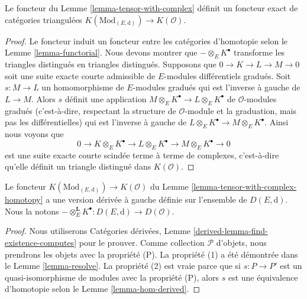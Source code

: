\begin{lemma}
\label{lemma-tensor-with-complex-homotopy}
Le foncteur du Lemme \ref{lemma-tensor-with-complex} définit un foncteur exact de
catégories triangulées $K(\text{Mod}_{(E, \text{d})}) \to K(\mathcal{O})$.
\end{lemma}

\begin{proof}
Le foncteur induit un foncteur entre les catégories d'homotopie selon le Lemme
\ref{lemma-functorial}. Nous devons montrer que $- \otimes_E K^\bullet$ transforme
les triangles distingués en triangles distingués. Supposons que $0 \to K \to L \to
M \to 0$ soit une suite exacte courte admissible de $E$-modules différentiels
gradués. Soit $s : M \to L$ un homomorphisme de $E$-modules gradués qui est
l'inverse à gauche de $L \to M$. Alors $s$ définit une application $M \otimes_E
K^\bullet \to L \otimes_E K^\bullet$ de $\mathcal{O}$-modules gradués
(c'est-à-dire, respectant la structure de $\mathcal{O}$-module et la graduation,
mais pas les différentielles) qui est l'inverse à gauche de $L \otimes_E K^\bullet
\to M \otimes_E K^\bullet$. Ainsi nous voyons que
$$
0 \to K \otimes_E K^\bullet \to L \otimes_E K^\bullet \to
M \otimes_E K^\bullet \to 0
$$
est une suite exacte courte scindée terme à terme de complexes, c'est-à-dire qu'elle
définit un triangle distingué dans $K(\mathcal{O})$.
\end{proof}

\begin{lemma}
\label{lemma-tensor-with-complex-derived}
Le foncteur $K(\text{Mod}_{(E, \text{d})}) \to K(\mathcal{O})$ du Lemme
\ref{lemma-tensor-with-complex-homotopy} a une version dérivée à gauche définie
sur l'ensemble de $D(E, \text{d})$. Nous la notons $- \otimes_E^\mathbf{L}
K^\bullet : D(E, \text{d}) \to D(\mathcal{O})$.
\end{lemma}

\begin{proof}
Nous utiliserons Catégories dérivées, Lemme
\ref{derived-lemma-find-existence-computes} pour le prouver. Comme
collection $\mathcal{P}$ d'objets, nous prendrons les objets avec la propriété
(P). La propriété (1) a été démontrée dans le Lemme \ref{lemma-resolve}. La
propriété (2) est vraie parce que si $s : P \to P'$ est un quasi-isomorphisme de
modules avec la propriété (P), alors $s$ est une équivalence d'homotopie selon le
Lemme \ref{lemma-hom-derived}.
\end{proof}

